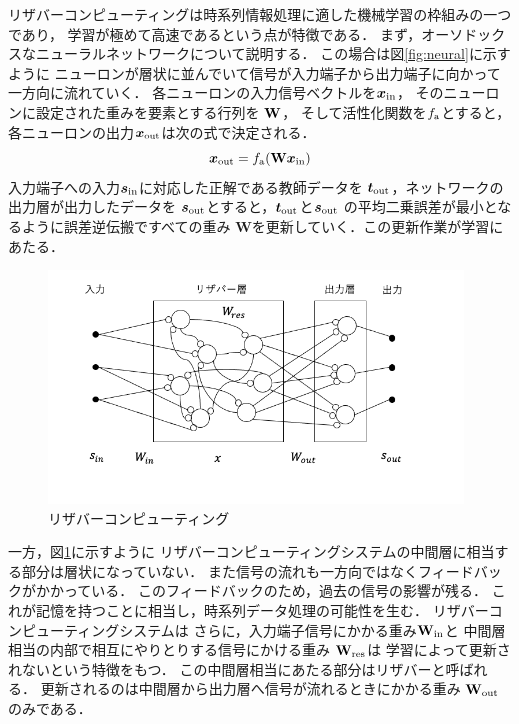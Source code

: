 \documentclass[uplatex,a4paper,10pt]{jsarticle}
\begin{document}
リザバーコンピューティングは時系列情報処理に適した機械学習の枠組みの一つであり，
学習が極めて高速であるという点が特徴である．
まず，オーソドックスなニューラルネットワークについて説明する．
この場合は図\ref{fig:neural}に示すように
ニューロンが層状に並んでいて信号が入力端子から出力端子に向かって一方向に流れていく．
各ニューロンの入力信号ベクトルを$\bm{x}_{\rm{in}}$，
そのニューロンに設定された重みを要素とする行列を
$\bf{W}$，
そして活性化関数を$f_{\rm{a}}$とすると，
各ニューロンの出力$\bm{x}_{\rm{out}}$は次の式で決定される．
\begin{equation}
    \bm{x}_{\rm{out}} = f_{\rm{a}}(\mathbf{W} \bm{x}_{\rm{in}})
\end{equation}
入力端子への入力$\bm{s}_{\rm{in}}$に対応した正解である教師データを
$\bm{t}_{\rm{out}}$，ネットワークの出力層が出力したデータを
$\bm{s}_{\rm{out}}$とすると，$\bm{t}_{\rm{out}}$と${\bm{s}_{\rm{out}}}$
の平均二乗誤差が最小となるように誤差逆伝搬ですべての重み
$\mathbf{W}$を更新していく．この更新作業が学習にあたる．

\begin{figure}[hbtp]
	\centering
	\includegraphics[width=110mm]{../img/reservoir.png}
    \caption{リザバーコンピューティング}
	\label{fig:reservoir}
\end{figure}

一方，図\ref{fig:reservoir}に示すように
リザバーコンピューティングシステムの中間層に相当する部分は層状になっていない．
また信号の流れも一方向ではなくフィードバックがかかっている．
このフィードバックのため，過去の信号の影響が残る．
これが記憶を持つことに相当し，時系列データ処理の可能性を生む．
リザバーコンピューティングシステムは
さらに，入力端子信号にかかる重み$\mathbf{W_{\rm{in}}}$と
中間層相当の内部で相互にやりとりする信号にかける重み
$\mathbf{W_{\rm{res}}}$は
学習によって更新されないという特徴をもつ．
この中間層相当にあたる部分はリザバーと呼ばれる．
更新されるのは中間層から出力層へ信号が流れるときにかかる重み
$\mathbf{W}_{\rm{out}}$のみである．
\end{document}
